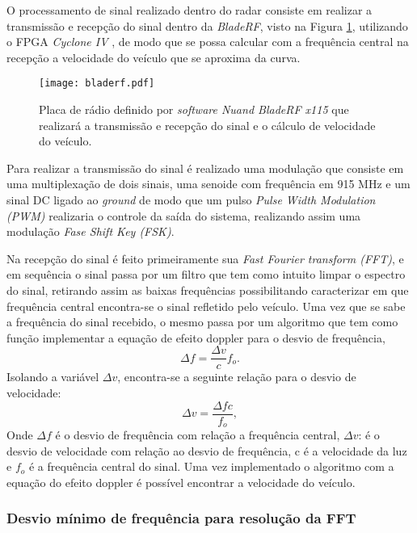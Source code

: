 O processamento de sinal realizado dentro do radar consiste em realizar a transmissão e recepção do sinal dentro da \emph{BladeRF}, visto na Figura \ref{bladerf}, utilizando o FPGA \emph{Cyclone IV} , de modo que se possa calcular com a frequência central na recepção a velocidade do veículo que se aproxima da curva. 

\begin{figure}[H]
    \centering
   \texttt{[image: bladerf.pdf]}
   \caption{Placa de rádio definido por \emph{software Nuand BladeRF x115} que realizará a transmissão e recepção do sinal e o cálculo de velocidade do veículo.}
   \label{bladerf}
    \end{figure}

Para realizar a transmissão do sinal é realizado uma modulação que consiste em uma multiplexação de dois sinais, uma senoide com frequência em 915 MHz e um sinal DC ligado ao \emph{ground} de modo que um pulso \emph{Pulse Width Modulation (PWM)} realizaria o controle da saída do sistema, realizando assim uma modulação \emph{Fase Shift Key (FSK)}.

Na recepção do sinal é feito primeiramente sua \emph{Fast Fourier transform (FFT)}, e em sequência o sinal passa por um filtro que tem como intuito limpar o espectro do sinal, retirando assim as baixas frequências possibilitando caracterizar em que frequência central encontra-se o sinal refletido pelo veículo. Uma vez que se sabe a frequência do sinal recebido, o mesmo passa por um algoritmo que tem como função implementar a equação de efeito doppler para o desvio de frequência,
\begin{equation}\label{freq_desv}
  \Delta f = \frac{\Delta v}{c}f_o.
\end{equation}
Isolando a variável $\Delta v$, encontra-se a seguinte relação para o desvio de velocidade:
\begin{equation}\label{vel}
  \Delta v = \frac{\Delta f c}{f_o},
\end{equation}
Onde $\Delta f$ é o desvio de frequência com relação a frequência central, $\Delta v$: é o desvio de velocidade com relação ao desvio de frequência, c é a velocidade da luz e $f_o$ é a frequência central do sinal. Uma vez implementado o algoritmo com a equação do efeito doppler é possível encontrar a velocidade do veículo.

\subsubsection{Desvio mínimo de frequência para resolução da FFT}

